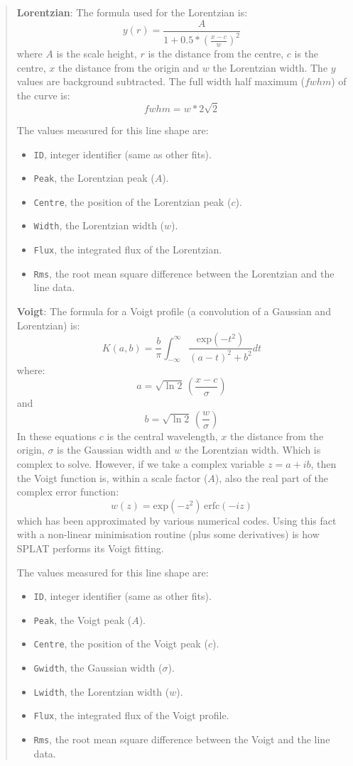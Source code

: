 \documentclass[twoside,11pt]{article}
\renewcommand{\_}{\texttt{\symbol{95}}}
\newcommand{\labelitem}[1]{\textbf{#1}}
\newcommand{\hitext}[1]{\texttt{#1}}
\begin{document}
\begin{quote}
 \labelitem{Lorentzian}: The formula used for the Lorentzian is:
 \[
  y(r) = \frac{A}{1+0.5*(\frac{x-c}{w})^{2}}
 \]
 where $A$ is the scale height, $r$ is the distance from the centre,
 $c$ is the centre, $x$ the distance from the origin and $w$ the
 Lorentzian width. The $y$ values are background subtracted. The full
 width half maximum ($fwhm$) of the curve is:
 \[
 fwhm = w*2\sqrt{2}
 \]

 The values measured for this line shape are:
 \begin{itemize}
   \item \hitext{ID}, integer identifier (same as other fits).
   \item \hitext{Peak}, the Lorentzian peak ($A$).
   \item \hitext{Centre}, the position of the Lorentzian peak ($c$).
   \item \hitext{Width}, the Lorentzian width ($w$).
   \item \hitext{Flux}, the integrated flux of the Lorentzian.
   \item \hitext{Rms}, the root mean square difference between the
         Lorentzian and the line data.
 \end{itemize}

 \labelitem{Voigt}: The formula for a Voigt profile (a convolution of a
 Gaussian and Lorentzian) is:
 \[
 K(a,b) = \frac{b}{\pi}\int_{-\infty}^{\infty}\frac{\mathrm{exp}(-t^{2})}{(a-t)^{2}+b^{2}}dt
 \]
 where:
 \[
 a = \sqrt{\ln{2}} \, \left(\frac{x-c}{\sigma}\right)
 \]
 and
 \[
 b = \sqrt{\ln{2}} \, \left(\frac{w}{\sigma}\right)
 \]
 In these equations $c$ is the central wavelength, $x$ the distance
 from the origin, $\sigma$ is the
 Gaussian width and $w$ the Lorentzian width. Which is complex to
 solve. However, if we take a complex variable $z=a+ib$, then the
 Voigt function is, within a scale factor ($A$), also the real part of
 the complex error function:
 \[
 w(z) = \mathrm{exp}(-z^{2}) \, \mathrm{erfc}(-iz)
 \]
 which has been approximated by various numerical codes. Using this
 fact with a non-linear minimisation routine (plus some derivatives) is
 how SPLAT performs its Voigt fitting.

 The values measured for this line shape are:
 \begin{itemize}
   \item \hitext{ID}, integer identifier (same as other fits).
   \item \hitext{Peak}, the Voigt peak ($A$).
   \item \hitext{Centre}, the position of the Voigt peak ($c$).
   \item \hitext{Gwidth}, the Gaussian width ($\sigma$).
   \item \hitext{Lwidth}, the Lorentzian width ($w$).
   \item \hitext{Flux}, the integrated flux of the Voigt profile.
   \item \hitext{Rms}, the root mean square difference between the
         Voigt and the line data.
 \end{itemize}
\end{quote}
\end{document}
